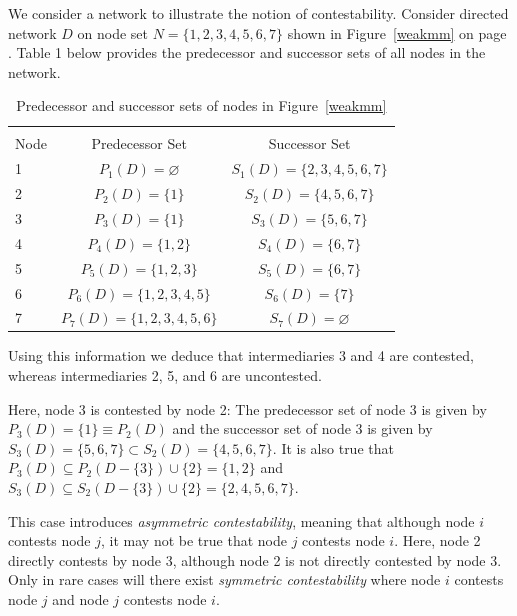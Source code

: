 \begin{example} \label{Simple Contestability}
We consider a network to illustrate the notion of contestability. Consider directed network $D$ on node set $N = \{1,2,3,4,5,6,7\}$ shown in Figure~\ref{weakmm} on page \pageref{weakmm}. Table 1 below provides the predecessor and successor sets of all nodes in the network.

\begin{table}[h]
\begin{center}
\label{network1stats}
\begin{tabu}{ l c c }

\\[-1.8ex]\hline
\hline \\[-1.8ex]
Node & Predecessor Set                 & Successor Set                     \\     & $P_{1}(D)=\varnothing$          & $S_{1}(D)=\{2,3,4,5,6,7\}$        \\
2    & $P_{2}(D)=\{1\}$                & $S_{2}(D)=\{4,5,6,7\}$            \\
3    & $P_{3}(D)=\{1\}$                & $S_{3}(D)=\{5,6,7\}$              \\
4    & $P_{4}(D)=\{1,2\}$              & $S_{4}(D)=\{6,7\}$                \\
5    & $P_{5}(D)=\{1,2,3\}$            & $S_{5}(D)=\{6,7\}$                \\
6    & $P_{6}(D)=\{1,2,3,4,5\}$        & $S_{6}(D)=\{7\}$                  \\
7    & $P_{7}(D)=\{1,2,3,4,5,6\}$      & $S_{7}(D)=\varnothing$            \\ \hline
\end{tabu}\par
\caption{Predecessor and successor sets of nodes in Figure~\ref{weakmm}}
\end{center}
\end{table}

\noindent
Using this information we deduce that intermediaries 3 and 4 are contested, whereas intermediaries 2, 5, and 6 are uncontested.

Here, node 3 is contested by node 2: The predecessor set of node 3 is given by $P_{3}(D) = \{1\} \equiv P_{2}(D)$ and the successor set of node 3 is given by $S_{3}(D) = \{5,6,7\} \subset S_{2}(D) = \{4,5,6,7\}$. It is also true that $P_{3}(D) \subseteq P_{2}(D - \{3\}) \cup \{2\} = \{ 1,2 \}$ and $S_{3}(D) \subseteq S_{2}(D - \{3\}) \cup \{2\} = \{ 2,4,5,6,7 \}$.

This case introduces \textit{asymmetric contestability}, meaning that although node $i$ contests node $j$, it may not be true that node $j$ contests node $i$. Here, node 2 directly contests by node 3, although node 2 is not directly contested by node 3. Only in rare cases will there exist \textit{symmetric contestability} where node $i$ contests node $j$ and node $j$ contests node $i$.
\end{example}

